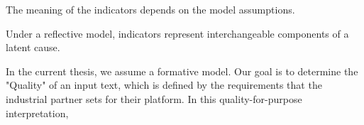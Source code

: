 



















The meaning of the indicators depends on the model assumptions. 

Under a reflective model, indicators represent interchangeable components of a latent cause.  


In the current thesis, we assume a formative model. Our goal is to determine the "Quality" of an input text, which is defined by the requirements that the industrial partner sets for their platform. In this quality-for-purpose interpretation, 








